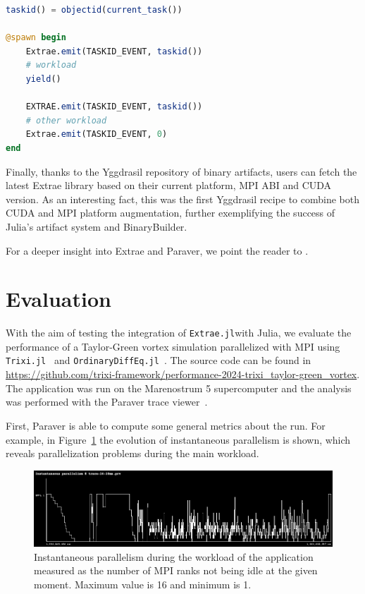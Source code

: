 \documentclass{juliacon}
\newcommand{\jlpkg}[1]{\texttt{#1}}
\newcommand{\extraejl}{\jlpkg{Extrae.jl}}
\begin{document}
\begin{lstlisting}[language=Julia, label=code:instrument-tasks, caption={Template code for instrumenting Julia tasks.}]
taskid() = objectid(current_task())

@spawn begin
    Extrae.emit(TASKID_EVENT, taskid())
    # workload
    yield()

    EXTRAE.emit(TASKID_EVENT, taskid())
    # other workload
    Extrae.emit(TASKID_EVENT, 0)
end
\end{lstlisting}

Finally, thanks to the Yggdrasil repository of binary artifacts, users can fetch the latest Extrae library based on their current platform, MPI ABI and CUDA version.
As an interesting fact, this was the first Yggdrasil recipe to combine both CUDA and MPI platform augmentation, further exemplifying the success of Julia's artifact system and BinaryBuilder.

For a deeper insight into Extrae and Paraver, we point the reader to \cite{extrae_documentation,paraver_reference,paraver_seminar}.

\section{Evaluation}\label{sec:evaluation}

With the aim of testing the integration of \extraejl with Julia, we evaluate the performance of a Taylor-Green vortex simulation parallelized with MPI using \jlpkg{Trixi.jl}~\cite{ranocha2022adaptive,schlottkelakemper2020trixi} and \jlpkg{OrdinaryDiffEq.jl}~\cite{DifferentialEquations.jl-2017}.
The source code can be found in \url{https://github.com/trixi-framework/performance-2024-trixi_taylor-green_vortex}.
The application was run on the Marenostrum 5 supercomputer and the analysis was performed with the Paraver trace viewer~\cite{paraver_reference,pillet1995paraver}.

First, Paraver is able to compute some general metrics about the run. For example, in Figure~\ref{fig:parallelism} the evolution of instantaneous parallelism is shown, which reveals parallelization problems during the main workload.

\begin{figure}[h]
    \centering
    \includegraphics[width=\linewidth]{Instantaneous_parallelism-trace-16-10ms.png}
    \caption{Instantaneous parallelism during the workload of the application measured as the number of MPI ranks not being idle at the given moment. Maximum value is 16 and minimum is 1.}
    \label{fig:parallelism}
\end{figure}
\end{document}
